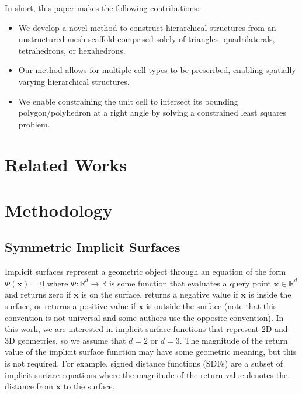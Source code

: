 \documentclass[acmtog]{acmart}
\begin{document}
In short, this paper makes the following contributions:
\begin{itemize}
  \item We develop a novel method to construct hierarchical structures from an unstructured mesh scaffold comprised solely of triangles, quadrilaterals, tetrahedrons, or hexahedrons.
  \item Our method allows for multiple cell types to be prescribed, enabling spatially varying hierarchical structures.
  \item We enable constraining the unit cell to intersect its bounding polygon/polyhedron at a right angle by solving a constrained least squares problem.
\end{itemize}

\section{Related Works}

\section{Methodology}

\subsection{Symmetric Implicit Surfaces}
\label{sec:symmetric_implicit_surfaces}

Implicit surfaces represent a geometric object through an equation of the form $\Phi(\mathbf{x}) = 0$ where $\Phi: \mathbb{R}^d \rightarrow \mathbb{R}$ is some function that evaluates a query point $\mathbf{x} \in \mathbb{R}^d$ and returns zero if $\mathbf{x}$ is on the surface, returns a negative value if $\mathbf{x}$ is inside the surface, or returns a positive value if $\mathbf{x}$ is outside the surface (note that this convention is not universal and some authors use the opposite convention). In this work, we are interested in implicit surface functions that represent 2D and 3D geometries, so we assume that $d = 2$ or $d = 3$. The magnitude of the return value of the implicit surface function may have some geometric meaning, but this is not required. For example, signed distance functions (SDFs) are a subset of implicit surface equations where the magnitude of the return value denotes the distance from $\mathbf{x}$ to the surface.
\end{document}
